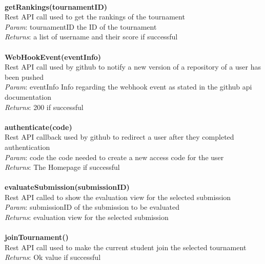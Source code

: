 \documentclass{article}
\begin{document}
\\
\textbf{getRankings(tournamentID)}\\
Rest API call used to get the rankings of the tournament\\
\textit{Param}: tournamentID the ID of the tournament\\
\textit{Returns}: a list of username and their score if successful\\
\\
\textbf{WebHookEvent(eventInfo)}\\
Rest API call used by github to notify a new version of a repository of a user has been pushed\\
\textit{Param}: eventInfo Info regarding the webhook event as stated in the github api documentation\\
\textit{Returns}: 200 if successful\\
\\
\textbf{authenticate(code)}\\
Rest API callback used by github to redirect a user after they completed authentication\\
\textit{Param}: code the code needed to create a new access code for the user\\
\textit{Returns}: The Homepage if successful\\
\\
\textbf{evaluateSubmission(submissionID)}\\
Rest API called to show the evaluation view for the selected submission\\
\textit{Param}: submissionID of the submission to be evaluated\\
\textit{Returns}: evaluation view for the selected submission\\
\\
\textbf{joinTournament()}\\
Rest API call used to make the current student join the selected tournament\\
\textit{Returns}: Ok value if successful\\
\end{document}
